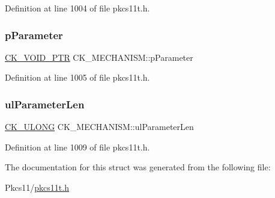 Definition at line 1004 of file pkcs11t.\+h.

\mbox{\label{struct_c_k___m_e_c_h_a_n_i_s_m_a1653492fcd85698632f51f84596eb743}} 
\subsubsection{\texorpdfstring{p\+Parameter}{pParameter}}
{\footnotesize\ttfamily \hyperlink{pkcs11t_8h_ace49359127edfc5665608140005b9a96}{C\+K\+\_\+\+V\+O\+I\+D\+\_\+\+P\+TR} C\+K\+\_\+\+M\+E\+C\+H\+A\+N\+I\+S\+M\+::p\+Parameter}



Definition at line 1005 of file pkcs11t.\+h.

\mbox{\label{struct_c_k___m_e_c_h_a_n_i_s_m_a47eeb17fc7cb3daac0e297c9af360798}} 
\subsubsection{\texorpdfstring{ul\+Parameter\+Len}{ulParameterLen}}
{\footnotesize\ttfamily \hyperlink{pkcs11t_8h_a35181858a3b7a0a81f49d180d8f446ef}{C\+K\+\_\+\+U\+L\+O\+NG} C\+K\+\_\+\+M\+E\+C\+H\+A\+N\+I\+S\+M\+::ul\+Parameter\+Len}



Definition at line 1009 of file pkcs11t.\+h.



The documentation for this struct was generated from the following file\+:\begin{DoxyCompactItemize}
\item 
Pkcs11/\hyperlink{pkcs11t_8h}{pkcs11t.\+h}\end{DoxyCompactItemize}
